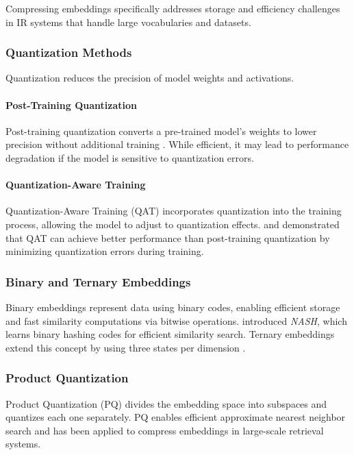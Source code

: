 Compressing embeddings specifically addresses storage and efficiency challenges in IR systems that handle large vocabularies and datasets.  
  
\subsubsection{Quantization Methods}  
  
Quantization reduces the precision of model weights and activations.  
  
\paragraph{Post-Training Quantization}  
  
Post-training quantization converts a pre-trained model's weights to lower precision without additional training \cite{jacob2018quantization}. While efficient, it may lead to performance degradation if the model is sensitive to quantization errors.  
  
\paragraph{Quantization-Aware Training}  
  
Quantization-Aware Training (QAT) incorporates quantization into the training process, allowing the model to adjust to quantization effects. \citet{hubara2017quantized} and \citet{mishra2018apprentice} demonstrated that QAT can achieve better performance than post-training quantization by minimizing quantization errors during training.  
  
\subsubsection{Binary and Ternary Embeddings}  
  
Binary embeddings represent data using binary codes, enabling efficient storage and fast similarity computations via bitwise operations. \citet{shen2018nash} introduced \textit{NASH}, which learns binary hashing codes for efficient similarity search. Ternary embeddings extend this concept by using three states per dimension \cite{shu2018compressing}.  
  
\subsubsection{Product Quantization}  
  
Product Quantization (PQ) \cite{jegou2010product} divides the embedding space into subspaces and quantizes each one separately. PQ enables efficient approximate nearest neighbor search and has been applied to compress embeddings in large-scale retrieval systems.  
  
